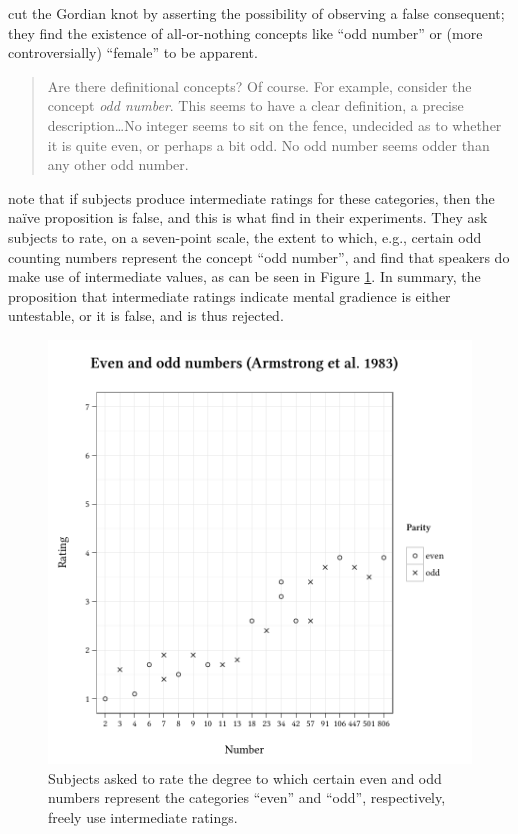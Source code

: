 \citet{Armstrong1983} cut the Gordian knot by asserting the possibility of observing a false consequent; they find the existence of all-or-nothing concepts like ``odd number'' or (more controversially) ``female'' to be apparent.

\begin{quote}
Are there definitional concepts? Of course. For example, consider the concept \emph{odd number}. This seems to have a clear definition, a precise description\ldots{}No integer seems to sit on the fence, undecided as to whether it is quite even, or perhaps a bit odd. No odd number seems odder than any other odd number. \citep[274]{Armstrong1983}
\end{quote}

\citeauthor{Armstrong1983} note that if subjects produce intermediate ratings for these categories, then the naïve proposition is false, and this is what \citeauthor{Armstrong1983} find in their experiments. They ask subjects to rate, on a seven-point scale, the extent to which, e.g., certain odd counting numbers represent the concept ``odd number'', and find that speakers do make use of intermediate values, as can be seen in Figure \ref{agg}. In summary, the proposition that intermediate ratings indicate mental gradience is either untestable, or it is false, and is thus rejected.

\begin{figure} \centering
\includegraphics{agg.pdf}
\caption{Subjects asked to rate the degree to which certain even and odd numbers represent the categories ``even'' and ``odd'', respectively, freely use intermediate ratings.}
\label{agg} 
\end{figure}

